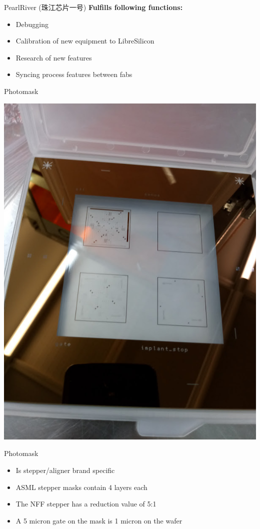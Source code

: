 \documentclass[aspectratio=169]{beamer}
\begin{document}
\begin{frame}{PearlRiver \cjkfont(珠江芯片一号)}
	\textbf{Fulfills following functions:}
	\begin{itemize}
		\item Debugging
		\item Calibration of new equipment to LibreSilicon
		\item Research of new features
		\item Syncing process features between fabs
	\end{itemize}
\end{frame}

\begin{frame}{Photomask}
	\begin{center}
		\includegraphics[height=0.8\textheight]{images/20181207_113845_Burst01.jpg}
	\end{center}
\end{frame}

\begin{frame}{Photomask}
	\begin{itemize}
		\item Is stepper/aligner brand specific
		\item ASML stepper masks contain 4 layers each
		\item The NFF stepper has a reduction value of 5:1
		\item A 5 micron gate on the mask is 1 micron on the wafer
	\end{itemize}
\end{frame}
\end{document}
